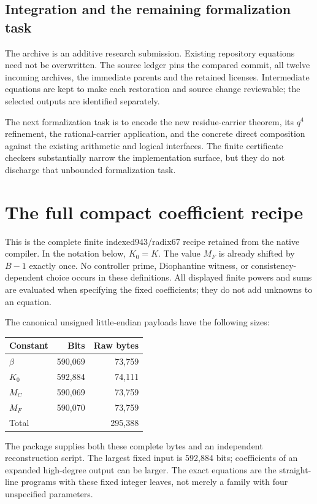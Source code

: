 \documentclass[11pt]{article}
\theoremstyle{remark}\newtheorem{remark}[theorem]{Remark}
\begin{document}
\subsection{Integration and the remaining formalization task}

The archive is an additive research submission. Existing repository
equations need not be overwritten. The source ledger pins the compared
commit, all twelve incoming archives, the immediate parents and the
retained licenses. Intermediate equations are kept to make each
restoration and source change reviewable; the selected outputs are
identified separately.

The next formalization task is to encode the new residue-carrier theorem,
its $q^4$ refinement, the rational-carrier application, and the concrete
direct composition against the existing arithmetic and logical interfaces.
The finite certificate checkers substantially narrow the implementation
surface, but they do not discharge that unbounded formalization task.



\appendix
\section{The full compact coefficient recipe}\label{app:compact}
This is the complete finite indexed943/radix67 recipe retained from the
native compiler. In the notation below, $K_0=K$. The value $M_F$ is
already shifted by $B-1$ exactly once. No controller prime, Diophantine
witness, or consistency-dependent choice occurs in these definitions.
All displayed finite powers and sums are evaluated when specifying
the fixed coefficients; they do not add unknowns to an equation.

The canonical unsigned little-endian payloads have the following sizes:
\begin{center}\small
\begin{tabular}{@{}lrr@{}}
\toprule
Constant & Bits & Raw bytes\\
\midrule
$\beta$ &590,069&73,759\\
$K_0$ &592,884&74,111\\
$M_C$ &590,069&73,759\\
$M_F$ &590,070&73,759\\
\midrule
Total&&295,388\\
\bottomrule
\end{tabular}
\end{center}
The package supplies both these complete bytes and an independent
reconstruction script. The largest fixed input is 592,884 bits;
coefficients of an expanded high-degree output can be larger.
The exact equations are the straight-line programs with these fixed
integer leaves, not merely a family with four unspecified parameters.
\end{document}
